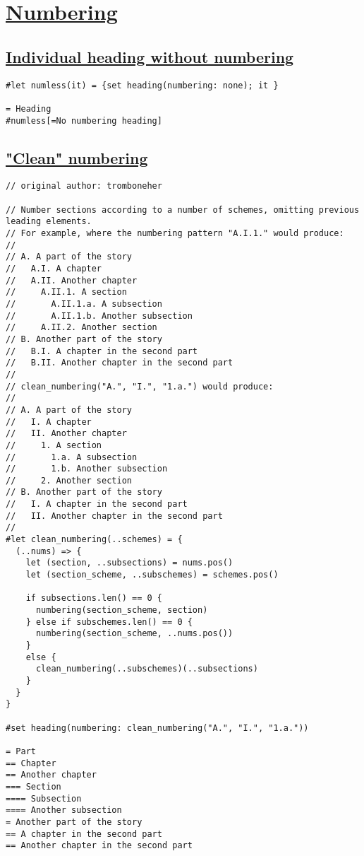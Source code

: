 \section{\texorpdfstring{\hyperref[numbering]{Numbering}}{Numbering}}\label{numbering}

\subsection{\texorpdfstring{\hyperref[individual-heading-without-numbering]{Individual
heading without
numbering}}{Individual heading without numbering}}\label{individual-heading-without-numbering}

\begin{verbatim}
#let numless(it) = {set heading(numbering: none); it }

= Heading
#numless[=No numbering heading]
\end{verbatim}

\pandocbounded{}

\subsection{\texorpdfstring{\hyperref[clean-numbering]{"Clean"
numbering}}{"Clean" numbering}}\label{clean-numbering}

\begin{verbatim}
// original author: tromboneher

// Number sections according to a number of schemes, omitting previous leading elements.
// For example, where the numbering pattern "A.I.1." would produce:
//
// A. A part of the story
//   A.I. A chapter
//   A.II. Another chapter
//     A.II.1. A section
//       A.II.1.a. A subsection
//       A.II.1.b. Another subsection
//     A.II.2. Another section
// B. Another part of the story
//   B.I. A chapter in the second part
//   B.II. Another chapter in the second part
//
// clean_numbering("A.", "I.", "1.a.") would produce:
//
// A. A part of the story
//   I. A chapter
//   II. Another chapter
//     1. A section
//       1.a. A subsection
//       1.b. Another subsection
//     2. Another section
// B. Another part of the story
//   I. A chapter in the second part
//   II. Another chapter in the second part
//
#let clean_numbering(..schemes) = {
  (..nums) => {
    let (section, ..subsections) = nums.pos()
    let (section_scheme, ..subschemes) = schemes.pos()

    if subsections.len() == 0 {
      numbering(section_scheme, section)
    } else if subschemes.len() == 0 {
      numbering(section_scheme, ..nums.pos())
    }
    else {
      clean_numbering(..subschemes)(..subsections)
    }
  }
}

#set heading(numbering: clean_numbering("A.", "I.", "1.a."))

= Part
== Chapter
== Another chapter
=== Section
==== Subsection
==== Another subsection
= Another part of the story
== A chapter in the second part
== Another chapter in the second part
\end{verbatim}

